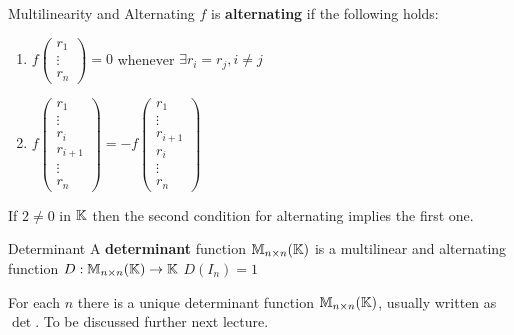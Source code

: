 \begin{definition} {Multilinearity and Alternating}
    \(f\) is \textbf{alternating} if the following holds:
    \begin{enumerate}
        \item \(f \begin{pmatrix}
            r_1 \\ \vdots \\ r_n
            \end{pmatrix} = 0\) whenever \(\exists r_i = r_j, i \neq j\)
            \item \(f \begin{pmatrix}
            r_1 \\ \vdots \\ r_i \\ r_{i+1}\\ \vdots \\ r_n
            \end{pmatrix} = -f \begin{pmatrix}
                r_1 \\ \vdots \\ r_{i+1}\\ r_i \\ \vdots \\ r_n
                \end{pmatrix} \) 
    \end{enumerate}
\end{definition}

\begin{remark}
    If \(2 \neq 0\) in \(\mathbb{K}\) then the second condition for alternating implies the first one.
\end{remark}

\begin{definition} {Determinant}
    A \textbf{determinant} function \(\mathbb{M}_{n \times n}(\mathbb{K})\) is a multilinear and alternating function \(D: \mathbb{M}_{n \times n}(\mathbb{K}) \to \mathbb{K}\) \st \(D(I_n) = 1\)
\end{definition}

\begin{remark}
    For each \(n\) there is a unique determinant function \(\mathbb{M}_{n\times n}(\mathbb{K})\), usually written as \(\det\). To be discussed further next lecture.
\end{remark}